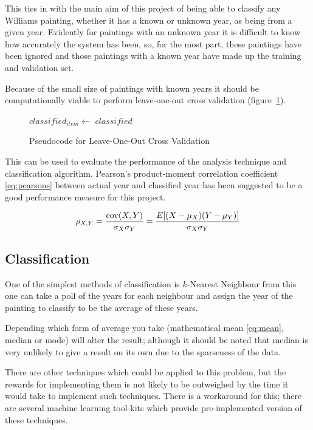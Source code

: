 This ties in with the main aim of this project of being able to classify any Williams
painting, whether it has a known or unknown year, as being from a given year. Evidently for 
paintings with an unknown year it is difficult to know how accurately the system has been, so, for
the most part, these paintings have been ignored and those paintings with a known year have made
up the training and validation set.

Because of the small size of paintings with known years it should be computationally viable to 
perform leave-one-out cross validation (figure~\ref{fig:loocv}).

\begin{figure}[h]
\begin{algorithmic}
 
    \State $classified_{item} \gets$  
  \EndFor
  \Statex
  \Return $classified$
\EndFunction
\end{algorithmic}
\caption{Pseudocode for Leave-One-Out Cross Validation}\label{fig:loocv}
\end{figure}

This can be used to evaluate the performance of the analysis technique and classification 
algorithm. Pearson's product-moment correlation coefficient \eqref{eq:pearsons} between actual year
and classified year has been suggested to be a good performance measure for this project.

\begin{equation}\label{eq:pearsons}
\rho_{X,Y}={\mathrm{cov}(X,Y) \over \sigma_X \sigma_Y} ={E[(X-\mu_X)(Y-\mu_Y)] \over \sigma_X\sigma_Y}
\end{equation}


\subsection{Classification}
One of the simplest methods of classification is $k$-Nearest Neighbour from
this one can take a poll of the years for each neighbour and assign the year of the painting to
classify to be the average of these years.

Depending which form of average you take (mathematical mean \eqref{eq:mean}, median or mode) will
alter the result; although it should be noted that median is very unlikely to give a result on its
own due to the sparseness of the data.

There are other techniques which could be applied to this problem, but the rewards for 
implementing them is not likely to be outweighed by the time it would take to implement such
techniques. There is a workaround for this; there are several machine learning tool-kits which 
provide pre-implemented version of these techniques.

